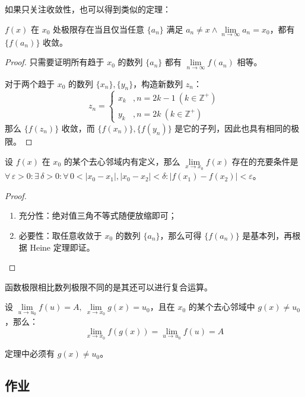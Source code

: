 如果只关注收敛性，也可以得到类似的定理：

\begin{theorem}
	$f(x)$ 在 $x_0$ 处极限存在当且仅当任意 $\{a_n\}$ 满足 $a_n \neq x \land \lim\limits_{n \to \infty} a_n = x_0$，都有 $\{f(a_n)\}$ 收敛。

	\begin{proof}
		只需要证明所有趋于 $x_0$ 的数列 $\{a_n\}$ 都有 $\lim\limits_{n \to \infty} f(a_n)$ 相等。

		对于两个趋于 $x_0$ 的数列 $\{x_n\},\{y_n\}$，构造新数列 $z_n$：
		$$
		z_n = \begin{cases}
			x_k & , n = 2k - 1\ (k \in \mathbb{Z}^+) \\
			y_k & , n = 2k\ (k \in \mathbb{Z}^+)
		\end{cases}
		$$
		那么 $\{f(z_n)\}$ 收敛，而 $\{f(x_n)\},\{f(y_n)\}$ 是它的子列，因此也具有相同的极限。
	\end{proof}
\end{theorem}

\begin{theorem}
	设 $f(x)$ 在 $x_0$ 的某个去心邻域内有定义，那么 $\lim\limits_{x \to x_0} f(x)$ 存在的充要条件是 $\forall\,\varepsilon > 0: \exists\,\delta > 0: \forall\,0 < |x_0 - x_1|,|x_0 - x_2| < \delta: |f(x_1) - f(x_2)| < \varepsilon$。

	\begin{proof}
		\begin{enumerate}
			\item 充分性：绝对值三角不等式随便放缩即可；
			\item 必要性：取任意收敛于 $x_0$ 的数列 $\{a_n\}$，那么可得 $\{f(a_n)\}$ 是基本列，再根据 Heine 定理即证。
		\end{enumerate}
	\end{proof}
\end{theorem}

函数极限相比数列极限不同的是其还可以进行复合运算。

\begin{theorem}[复合函数的极限]
	设 $\lim\limits_{u \to u_0} f(u) = A,\ \lim\limits_{x \to x_0} g(x) = u_0$，且在 $x_0$ 的某个去心邻域中 $g(x) \neq u_0$，那么：
	$$
	\lim_{x \to x_0} f(g(x)) = \lim_{u \to u_0} f(u) = A
	$$
\end{theorem}

定理中必须有 $g(x) \neq u_0$。

\subsection{作业}

